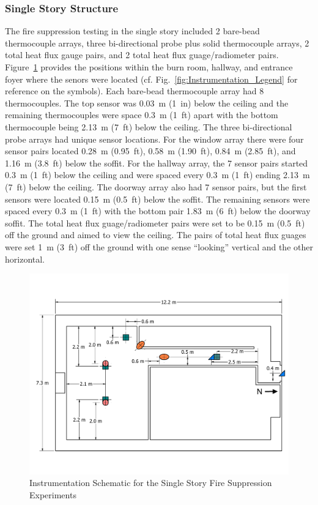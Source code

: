 \documentclass[12pt,oneside]{book}
\begin{document}
\subsubsection*{Single Story Structure}

The fire suppression testing in the single story included 2 bare-bead thermocouple arrays, three bi-directional probe plus solid thermocouple arrays, 2 total heat flux gauge pairs, and 2 total heat flux guage/radiometer pairs. Figure~\ref{fig:Fire_Suppression_Instrumentation_Dimensions} provides the positions within the burn room, hallway, and entrance foyer where the senors were located (cf. Fig.~\ref{fig:Instrumentation_Legend} for reference on the symbols). Each bare-bead thermocouple array had 8 thermocouples. The top sensor was 0.03~m (1~in) below the ceiling and the remaining thermocouples were space 0.3~m (1~ft) apart with the bottom thermocouple being 2.13~m (7~ft) below the ceiling. The three bi-directional probe arrays had unique sensor locations. For the window array there were four sensor pairs located 0.28~m (0.95~ft), 0.58~m (1.90~ft), 0.84~m (2.85~ft), and 1.16~m (3.8~ft) below the soffit. For the hallway array, the 7 sensor pairs started 0.3~m (1~ft) below the ceiling and were spaced every 0.3~m (1~ft) ending 2.13~m (7~ft) below the ceiling. The doorway array also had 7 sensor pairs, but the first sensors were located 0.15~m (0.5~ft) below the soffit. The remaining sensors were spaced every 0.3~m (1~ft) with the bottom pair 1.83~m (6~ft) below the doorway soffit. The total heat flux guage/radiometer pairs were set to be 0.15~m (0.5~ft) off the ground and aimed to view the ceiling. The pairs of total heat flux guages were set 1~m (3~ft) off the ground with one sense ``looking'' vertical and the other horizontal.

\begin{figure}[!ht]
	\includegraphics[width=\columnwidth]{../Figures/Floor_Plans/PDFs/East_Structure/DelCo_2012_East_Structure_Instrumentation}
	\caption{Instrumentation Schematic for the Single Story Fire Suppression Experiments}
	\label{fig:Fire_Suppression_Instrumentation_Dimensions}
\end{figure}
\end{document}
